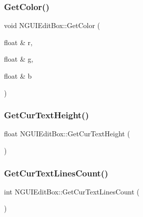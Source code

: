 \subsubsection{\texorpdfstring{Get\+Color()}{GetColor()}}
{\footnotesize\ttfamily void N\+G\+U\+I\+Edit\+Box\+::\+Get\+Color (\begin{DoxyParamCaption}\item[{float \&}]{r,  }\item[{float \&}]{g,  }\item[{float \&}]{b }\end{DoxyParamCaption})}

\hypertarget{class_n_g_u_i_edit_box_a39059c31599ae1e142c98a42eec77aee}{}\label{class_n_g_u_i_edit_box_a39059c31599ae1e142c98a42eec77aee} 
\subsubsection{\texorpdfstring{Get\+Cur\+Text\+Height()}{GetCurTextHeight()}}
{\footnotesize\ttfamily float N\+G\+U\+I\+Edit\+Box\+::\+Get\+Cur\+Text\+Height (\begin{DoxyParamCaption}{ }\end{DoxyParamCaption})}

\hypertarget{class_n_g_u_i_edit_box_adc5538b0647a8302d0b782a85975557b}{}\label{class_n_g_u_i_edit_box_adc5538b0647a8302d0b782a85975557b} 
\subsubsection{\texorpdfstring{Get\+Cur\+Text\+Lines\+Count()}{GetCurTextLinesCount()}}
{\footnotesize\ttfamily int N\+G\+U\+I\+Edit\+Box\+::\+Get\+Cur\+Text\+Lines\+Count (\begin{DoxyParamCaption}{ }\end{DoxyParamCaption})}

\hypertarget{class_n_g_u_i_edit_box_ae6959babd5ff1b9ed009010954e3dc4e}{}\label{class_n_g_u_i_edit_box_ae6959babd5ff1b9ed009010954e3dc4e} 
